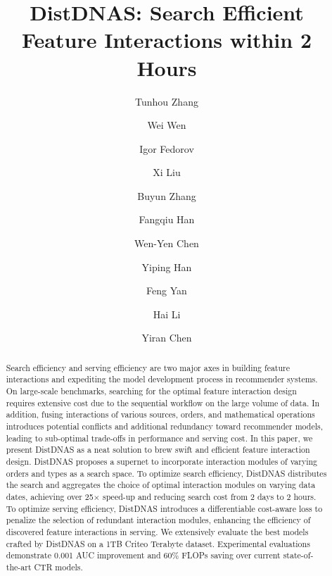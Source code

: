 \documentclass[sigconf]{acmart}
\author{Tunhou Zhang}
\affiliation{%
  \institution{Duke University}
  \city{Durham}
  \country{USA}
 }
\author{Wei Wen}
\affiliation{%
  \institution{Meta AI}
  \city{Menlo Park}
  \country{USA}
}
\author{Igor Fedorov}
\affiliation{%
  \institution{Meta AI}
  \city{Menlo Park}
  \country{USA}
}
\author{Xi Liu}
\affiliation{%
  \institution{Meta AI}
  \city{Menlo Park}
  \country{USA}
}
\author{Buyun Zhang}
\affiliation{%
  \institution{Meta AI}
  \city{Menlo Park}
  \country{USA}
}
\author{Fangqiu Han}
\affiliation{%
  \institution{Meta AI}
  \city{Menlo Park}
  \country{USA}
}
\author{Wen-Yen Chen}
\affiliation{%
  \institution{Meta AI}
  \city{Menlo Park}
  \country{USA}
}
\author{Yiping Han}
\affiliation{%
  \institution{Meta AI}
  \city{Menlo Park}
  \country{USA}
}
\author{Feng Yan}
\affiliation{%
  \institution{University of Houston}
  \city{Houston}
  \country{USA}
}
\author{Hai Li}
\affiliation{%
  \institution{Duke University}
  \city{Durham}
  \country{USA}
 }
\author{Yiran Chen}
\affiliation{%
  \institution{Duke University}
  \city{Durham}
  \country{USA}
 }
\begin{document}
\title{DistDNAS: Search Efficient Feature Interactions within 2 Hours}


\begin{abstract}
Search efficiency and serving efficiency are two major axes in building feature interactions and expediting the model development process in recommender systems.
On large-scale benchmarks, searching for the optimal feature interaction design requires extensive cost due to the sequential workflow on the large volume of data.
In addition, fusing interactions of various sources, orders, and mathematical operations introduces potential conflicts and additional redundancy toward recommender models, leading to sub-optimal trade-offs in performance and serving cost. 
In this paper, we present DistDNAS as a neat solution to brew swift and efficient feature interaction design.
DistDNAS proposes a supernet to incorporate interaction modules of varying orders and types as a search space. 
To optimize search efficiency, DistDNAS distributes the search and aggregates the choice of optimal interaction modules on varying data dates, achieving over 25$\times$ speed-up and reducing search cost from 2 days to 2 hours.
To optimize serving efficiency, DistDNAS introduces a differentiable cost-aware loss to penalize the selection of redundant interaction modules, enhancing the efficiency of discovered feature interactions in serving.
We extensively evaluate the best models crafted by DistDNAS on a 1TB Criteo Terabyte dataset.
Experimental evaluations demonstrate 0.001 AUC improvement and 60\% FLOPs saving over current state-of-the-art CTR models.
\end{abstract}
\end{document}

